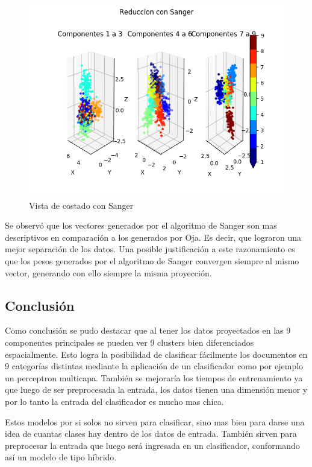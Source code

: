 \begin{figure}[H]
  \includegraphics[width=160mm]{imagenes/componentes_sanger_3.png}
  \caption{Vista de costado con Sanger}
\end{figure}

Se observó que los vectores generados por el algoritmo de Sanger son mas
descriptivos en comparación a los generados por Oja.  Es decir, que lograron
una mejor separación de los datos. Una posible justificación a este
razonamiento es que los pesos generados por el algoritmo de Sanger convergen
siempre al mismo vector, generando con ello siempre la misma proyección.

\subsection{Conclusión}
Como conclusión se pudo destacar que al tener los datos proyectados en las 9
componentes principales se pueden ver 9 clusters bien diferenciados
espacialmente.  Esto logra la posibilidad de clasificar fácilmente los
documentos en 9 categorías distintas mediante la aplicación de un clasificador
como por ejemplo un perceptron multicapa.  También se mejoraría los tiempos de
entrenamiento ya que luego de ser preprocesada la entrada, los datos tienen una
dimensión menor y por lo tanto la entrada del clasificador es mucho mas chica.

Estos modelos por si solos no sirven para clasificar, sino mas bien para darse
una idea de cuantas clases hay dentro de los datos de entrada. También sirven
para preprocesar la entrada que luego será ingresada en un clasificador,
conformando así un modelo de tipo híbrido.
\newpage
